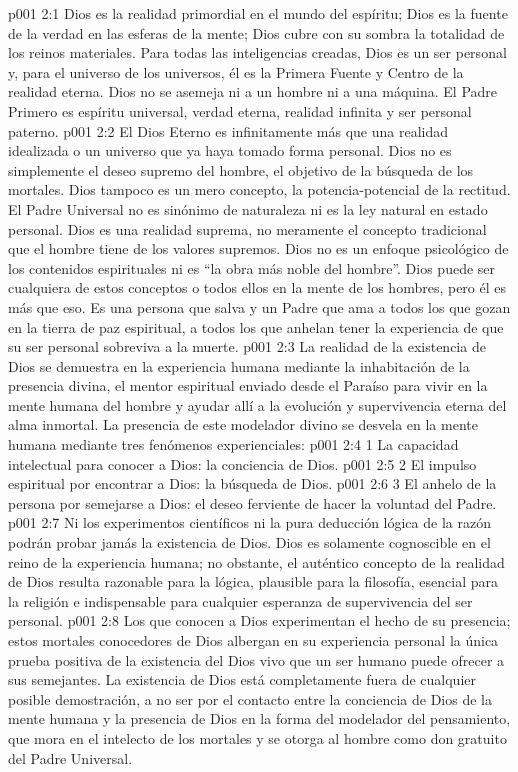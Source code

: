 \vs p001 2:1 Dios es la realidad primordial en el mundo del espíritu; Dios es la fuente de la verdad en las esferas de la mente; Dios cubre con su sombra la totalidad de los reinos materiales. Para todas las inteligencias creadas, Dios es un ser personal y, para el universo de los universos, él es la Primera Fuente y Centro de la realidad eterna. Dios no se asemeja ni a un hombre ni a una máquina. El Padre Primero es espíritu universal, verdad eterna, realidad infinita y ser personal paterno.
\vs p001 2:2 \pc El Dios Eterno es infinitamente más que una realidad idealizada o un universo que ya haya tomado forma personal. Dios no es simplemente el deseo supremo del hombre, el objetivo de la búsqueda de los mortales. Dios tampoco es un mero concepto, la potencia\hyp{}potencial de la rectitud. El Padre Universal no es sinónimo de naturaleza ni es la ley natural en estado personal. Dios es una realidad suprema, no meramente el concepto tradicional que el hombre tiene de los valores supremos. Dios no es un enfoque psicológico de los contenidos espirituales ni es “la obra más noble del hombre”. Dios puede ser cualquiera de estos conceptos o todos ellos en la mente de los hombres, pero él es más que eso. Es una persona que salva y un Padre que ama a todos los que gozan en la tierra de paz espiritual, a todos los que anhelan tener la experiencia de que su ser personal sobreviva a la muerte.
\vs p001 2:3 \pc La realidad de la existencia de Dios se demuestra en la experiencia humana mediante la inhabitación de la presencia divina, el mentor espiritual enviado desde el Paraíso para vivir en la mente humana del hombre y ayudar allí a la evolución y supervivencia eterna del alma inmortal. La presencia de este modelador divino se desvela en la mente humana mediante tres fenómenos experienciales:
\vs p001 2:4 1 La capacidad intelectual para conocer a Dios: la conciencia de Dios.
\vs p001 2:5 2 El impulso espiritual por encontrar a Dios: la búsqueda de Dios.
\vs p001 2:6 3 El anhelo de la persona por semejarse a Dios: el deseo ferviente de hacer la voluntad del Padre.
\vs p001 2:7 \pc Ni los experimentos científicos ni la pura deducción lógica de la razón podrán probar jamás la existencia de Dios. Dios es solamente cognoscible en el reino de la experiencia humana; no obstante, el auténtico concepto de la realidad de Dios resulta razonable para la lógica, plausible para la filosofía, esencial para la religión e indispensable para cualquier esperanza de supervivencia del ser personal.
\vs p001 2:8 Los que conocen a Dios experimentan el hecho de su presencia; estos mortales conocedores de Dios albergan en su experiencia personal la única prueba positiva de la existencia del Dios vivo que un ser humano puede ofrecer a sus semejantes. La existencia de Dios está completamente fuera de cualquier posible demostración, a no ser por el contacto entre la conciencia de Dios de la mente humana y la presencia de Dios en la forma del modelador del pensamiento, que mora en el intelecto de los mortales y se otorga al hombre como don gratuito del Padre Universal.
